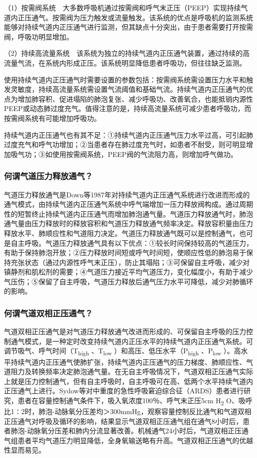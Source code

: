 （1）按需阀系统　大多数呼吸机通过按需阀和呼气末正压（PEEP）实现持续气道内正压通气。按需阀为压力触发或流量触发。该系统的优点是呼吸机的监测系统能够对持续气道内正压通气进行监测，但其缺点十分突出，由于患者需要打开按需阀，呼吸功明显增加。

（2）持续高流量系统　该系统为独立的持续气道内正压通气装置，通过持续的高流量气流，在系统内形成正压。该系统明显降低患者呼吸功，但往往缺乏监测。

使用持续气道内正压通气时需要设置的参数包括：按需阀系统需设置压力水平和触发灵敏度，持续高流量系统需设置气流阈值和基础气流。持续气道内正压通气的优点为增加肺容积、促进塌陷的肺泡复张、减少呼吸功、改善氧合，也能抵销内源性PEEP或动态肺过度充气。值得注意的是，持续高流量系统可减少患者呼吸功，而按需阀系统有可能增加呼吸功。

持续气道内正压通气也有其不足：①持续气道内正压通气压力水平过高，可引起肺过度充气和呼气功增加；②当患者存在肺过度充气时，如患者不耐受，则可明显增加吸气功；③如使用按需阀系统，PEEP阀的气流阻力高，则增加呼气做功。

\subsubsection{何谓气道压力释放通气？}

气道压力释放通气是Down等1987年对持续气道内正压通气系统进行改进而形成的通气模式，由持续气道内正压通气系统中呼气端增加一压力释放阀构成。通过周期性的短暂终止持续气道内正压通气而增加肺泡通气量。气道压力释放通气时，肺泡通气量由压力释放时的释放容积和气道压力释放通气频率决定。释放容积量由压力释放水平、肺顺应性和气道阻力决定。气道压力释放通气既可以是控制通气，也可是自主呼吸。气道压力释放通气具有以下优点：①较长时间保持较高的气道压力，有助于保持肺泡开放；②压力释放时间短或呼气时间短，使顺应性低的肺泡易于保持充张状态（通过内源性呼气末正压），防止其塌陷；③可保留自主呼吸，减少对镇静剂和肌松剂的需要；④气道压力接近平均气道压力，变化幅度小，有助于减少气压伤；⑤保留了自主呼吸，气道压力释放后通气压力水平可降低，减少对肺循环的影响。

\subsubsection{何谓气道双相正压通气？}

气道双相正压通气是对气道压力释放通气改进而形成的、可保留自主呼吸的压力控制通气模式，是一种定时改变持续气道内正压水平的持续气道内正压通气系统。可调节吸气、呼气时间（T\textsubscript{high}
、T\textsubscript{low} ）和高压、低压水平（P\textsubscript{high}
、P\textsubscript{low}
）。高水平持续气道内正压通气使肺扩张，持续气道内正压通气的压力梯度、肺顺应性、气道阻力及转换频率决定肺泡通气量。在无自主呼吸情况下，气道双相正压通气实际上就是压力控制通气，但有自主呼吸时，自主呼吸可在高、低两个水平持续气道内正压通气上进行。Sydow等对中重度的急性呼吸窘迫综合征（ARDS）患者进行研究，患者在容量控制通气条件下，吸入氧浓度100％、呼气末正压5cm
H\textsubscript{2}
O、吸呼比1∶2时，肺泡-动脉氧分压差均＞300mmHg，观察容量控制反比通气和气道双相正压通气对呼吸及循环的影响，结果显示气道双相正压通气组在通气8小时后，患者肺泡-动脉氧分压差和肺内分流显著改善。机械通气24小时后，气道双相正压通气组患者平均气道压力明显降低，全身氧输送略有升高。气道双相正压通气的优越性显而易见。

